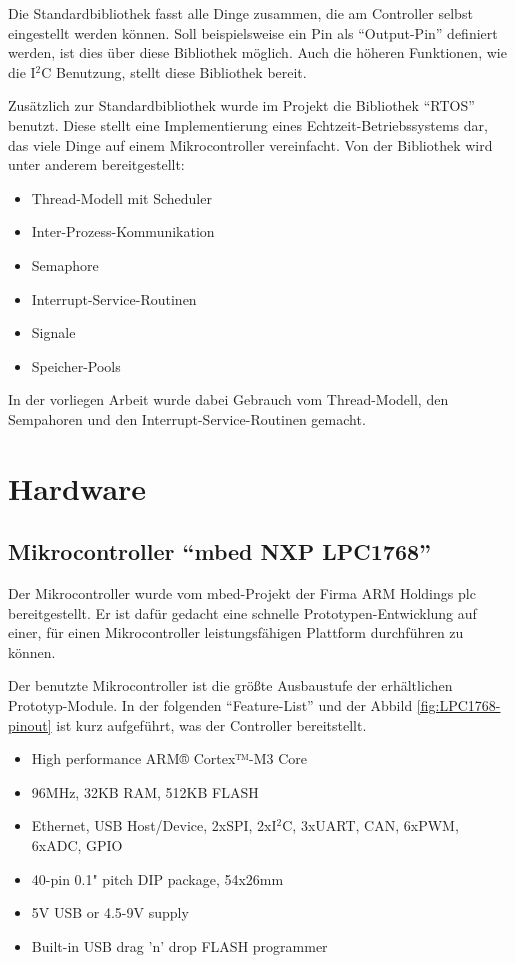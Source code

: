 			Die Standardbibliothek fasst alle Dinge zusammen, die am Controller selbst eingestellt werden können. Soll beispielsweise ein Pin als \enquote{Output-Pin} definiert werden, ist dies über diese Bibliothek möglich. Auch die höheren Funktionen, wie die I$^{2}$C Benutzung, stellt diese Bibliothek bereit.
			
			Zusätzlich zur Standardbibliothek wurde im Projekt die Bibliothek \enquote{RTOS} benutzt. Diese stellt eine Implementierung eines Echtzeit-Betriebssystems dar, das viele Dinge auf einem Mikrocontroller vereinfacht. Von der Bibliothek wird unter anderem bereitgestellt:
			
			\begin{itemize}
				\item Thread-Modell mit Scheduler
				\item Inter-Prozess-Kommunikation
				\item Semaphore
				\item Interrupt-Service-Routinen
				\item Signale
				\item Speicher-Pools
			\end{itemize}
			
			In der vorliegen Arbeit wurde dabei Gebrauch vom Thread-Modell, den Sempahoren und den Interrupt-Service-Routinen gemacht.
			
			\cite{RTOS}
	\section{Hardware}
		\subsection{Mikrocontroller \enquote{mbed NXP LPC1768}}
			Der Mikrocontroller wurde vom mbed-Projekt der Firma ARM Holdings plc bereitgestellt. Er ist dafür gedacht eine schnelle Prototypen-Entwicklung auf einer, für einen Mikrocontroller leistungsfähigen Plattform durchführen zu können.
			
			Der benutzte Mikrocontroller ist die größte Ausbaustufe der erhältlichen Prototyp-Module. In der folgenden \enquote{Feature-List} \cite{LPC1768} und der Abbild \ref{fig:LPC1768-pinout} ist kurz aufgeführt, was der Controller bereitstellt.
			
			\begin{itemize}
				\item High performance ARM® Cortex™-M3 Core
				\item 96MHz, 32KB RAM, 512KB FLASH
				\item Ethernet, USB Host/Device, 2xSPI, 2xI$^{2}$C, 3xUART, CAN, 6xPWM, 6xADC, GPIO
				\item 40-pin 0.1" pitch DIP package, 54x26mm
				\item 5V USB or 4.5-9V supply
				\item Built-in USB drag 'n' drop FLASH programmer
			\end{itemize}
			
